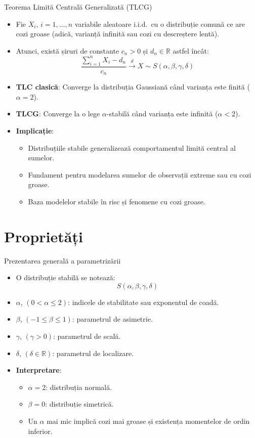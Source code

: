 \documentclass[9pt, aspectratio=169, t]{beamer}
\theoremstyle{definition}
\newcommand{\R}{\mathbb{R}}
\begin{document}
\begin{frame}{Teorema Limită Centrală Generalizată (TLCG)}
\begin{itemize}
    \item Fie $X_i$, $i = 1, \ldots, n$ variabile aleatoare i.i.d.\ cu o distribuție comună ce are cozi groase (adică, varianță infinită sau cozi cu descreștere lentă).
    \item Atunci, există șiruri de constante $c_n > 0$ și $d_n \in \R$ astfel încât:
    \[
        \frac{\sum_{i=1}^n X_i - d_n}{c_n} \stackrel{d}{\to} X \sim S(\alpha, \beta, \gamma, \delta)
    \]
    \item \textbf{TLC clasică}: Converge la distribuția Gaussiană când varianța este finită ($\alpha = 2$).
    \item \textbf{TLCG}: Converge la o lege $\alpha$-stabilă când varianța este infinită ($\alpha < 2$).
    \item \textbf{Implicație}:
    \begin{itemize}
        \item Distribuțiile stabile generalizează comportamentul limită central al sumelor.
        \item Fundament pentru modelarea sumelor de observații extreme sau cu cozi groase.
        \item Baza modelelor stabile în risc și fenomene cu cozi groase.
    \end{itemize}
\end{itemize}
\end{frame}

\section{Proprietăți}

\begin{frame}{Prezentarea generală a parametrizării}
\begin{itemize}
    \item O distribuție stabilă se notează:
    \[
        S(\alpha, \beta, \gamma, \delta)
    \]
    \item $\alpha$, $(0 < \alpha \leq 2)$: indicele de stabilitate sau exponentul de coadă.
    \item $\beta$, $(-1 \leq \beta \leq 1)$: parametrul de asimetrie.
    \item $\gamma$, $(\gamma > 0)$: parametrul de scală.
    \item $\delta$, $(\delta \in \R)$: parametrul de localizare.
    \item \textbf{Interpretare}:
    \begin{itemize}
        \item $\alpha = 2$: distribuția normală.
        \item $\beta = 0$: distribuție simetrică.
        \item Un $\alpha$ mai mic implică cozi mai groase și existența momentelor de ordin inferior.
    \end{itemize}
\end{itemize}
\end{frame}
\end{document}
